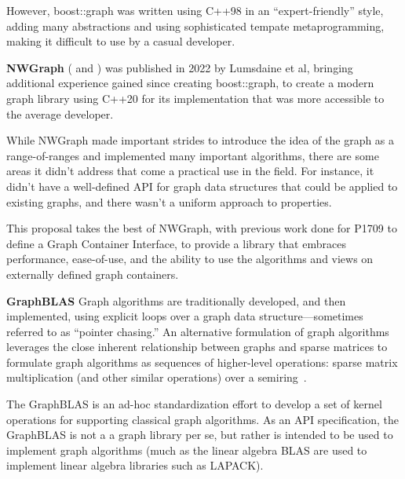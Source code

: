 However, boost::graph was written using C++98 in an ``expert-friendly'' style, adding many abstractions and using sophisticated tempate metaprogramming, making it difficult to use by a casual developer.

\medskip

\textbf{NWGraph} (\cite{REF_nwgraph_library} and \cite{REF_nwgraph_paper}) was published in 2022
by Lumsdaine et al, bringing additional experience gained since creating boost::graph, to create a modern graph library using C++20 for its implementation 
that was more accessible to the average developer. %

While NWGraph made important strides to introduce the idea of the graph as a range-of-ranges and implemented many important algorithms,
there are some areas it didn't address that come a practical use in the field. For instance, it didn't have a well-defined API for graph
data structures that could be applied to existing graphs, and there wasn't a uniform approach to properties.

This proposal takes the best of NWGraph, with previous work done for P1709 to define a Graph Container Interface, to provide a library that
embraces performance, ease-of-use, and the ability to use the algorithms and views on externally defined graph containers.

\medskip

\textbf{GraphBLAS}
Graph algorithms are traditionally developed, and then implemented, using explicit loops
over a graph data structure---sometimes referred to as ``pointer chasing.''
An alternative formulation of graph algorithms leverages the close inherent relationship between
graphs and sparse matrices to formulate graph algorithms as sequences of higher-level operations:
sparse matrix multiplication (and other similar operations) over a semiring~\cite{kepner-gilbert}.

The GraphBLAS is an ad-hoc
standardization effort to develop a set of kernel operations for supporting classical
graph algorithms.  As an API specification, the GraphBLAS is not a a graph library per se, 
but rather is intended to be
used to implement graph algorithms (much as the linear algebra BLAS are used  to implement
linear algebra libraries such as LAPACK).

